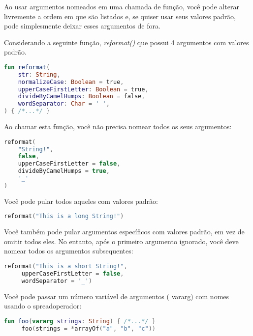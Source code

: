 Ao usar argumentos nomeados em uma chamada de função, você pode alterar livremente a ordem em que são listados e, se quiser usar seus valores padrão, pode simplesmente deixar esses argumentos de fora.  

Considerando a seguinte função, \emph{reformat()} que possui 4 argumentos com valores padrão.
\begin{lstlisting}[label={lst:example1}, language=Kotlin]
  fun reformat(
    str: String,
    normalizeCase: Boolean = true,
    upperCaseFirstLetter: Boolean = true,
    divideByCamelHumps: Boolean = false,
    wordSeparator: Char = ' ',
) { /*...*/ }
  \end{lstlisting}

Ao chamar esta função, você não precisa nomear todos os seus argumentos:

\begin{lstlisting}[label={lst:example1}, language=Kotlin]
    reformat(
    "String!",
    false,
    upperCaseFirstLetter = false,
    divideByCamelHumps = true,
    '_'
)
    \end{lstlisting}

Você pode pular todos aqueles com valores padrão:
\begin{lstlisting}[label={lst:example1}, language=Kotlin]
      reformat("This is a long String!")
      \end{lstlisting}

Você também pode pular argumentos específicos com valores padrão, em vez de omitir todos eles. No entanto, após o primeiro argumento ignorado, você deve nomear todos os argumentos subsequentes:
\begin{lstlisting}[label={lst:example1}, language=Kotlin]
     reformat("This is a short String!",
     upperCaseFirstLetter = false,
     wordSeparator = '_')
        \end{lstlisting}
Você pode passar um número variável de argumentos ( vararg) com nomes usando o spreadoperador:
\begin{lstlisting}[label={lst:example1}, language=Kotlin]
     fun foo(vararg strings: String) { /*...*/ }
     foo(strings = *arrayOf("a", "b", "c"))
          \end{lstlisting}


